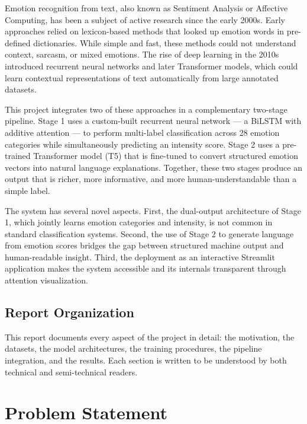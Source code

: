 \documentclass[12pt, a4paper]{report}
\begin{document}
Emotion recognition from text, also known as Sentiment Analysis or Affective Computing, has been a subject of active research since the early 2000s. Early approaches relied on lexicon-based methods that looked up emotion words in pre-defined dictionaries. While simple and fast, these methods could not understand context, sarcasm, or mixed emotions. The rise of deep learning in the 2010s introduced recurrent neural networks and later Transformer models, which could learn contextual representations of text automatically from large annotated datasets.

This project integrates two of these approaches in a complementary two-stage pipeline. Stage 1 uses a custom-built recurrent neural network — a BiLSTM with additive attention — to perform multi-label classification across 28 emotion categories while simultaneously predicting an intensity score. Stage 2 uses a pre-trained Transformer model (T5) that is fine-tuned to convert structured emotion vectors into natural language explanations. Together, these two stages produce an output that is richer, more informative, and more human-understandable than a simple label.

The system has several novel aspects. First, the dual-output architecture of Stage 1, which jointly learns emotion categories and intensity, is not common in standard classification systems. Second, the use of Stage 2 to generate language from emotion scores bridges the gap between structured machine output and human-readable insight. Third, the deployment as an interactive Streamlit application makes the system accessible and its internals transparent through attention visualization.

\section{Report Organization}
This report documents every aspect of the project in detail: the motivation, the datasets, the model architectures, the training procedures, the pipeline integration, and the results. Each section is written to be understood by both technical and semi-technical readers.

\chapter{Problem Statement}
\end{document}
